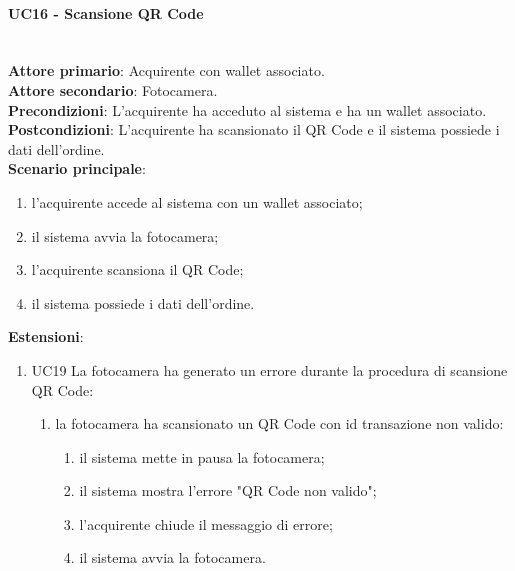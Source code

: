 \documentclass[a4paper, 12pt]{article}
\begin{document}
\paragraph{UC16 - Scansione QR Code}\\
\textbf{Attore primario}: Acquirente con wallet associato.\\
\textbf{Attore secondario}: Fotocamera.\\
\textbf{Precondizioni}: L'acquirente ha acceduto al sistema e ha un wallet associato.\\
\textbf{Postcondizioni}: L'acquirente ha scansionato il QR Code e il sistema possiede i dati dell'ordine.\\
\textbf{Scenario principale}:
\begin{enumerate}
    \item l'acquirente accede al sistema con un wallet associato;
    \item il sistema avvia la fotocamera;
    \item l'acquirente scansiona il QR Code;
    \item il sistema possiede i dati dell'ordine.
\end{enumerate}
\textbf{Estensioni}:
\begin{enumerate}
    \item UC19 La fotocamera ha generato un errore durante la procedura di scansione QR Code:
    \begin{enumerate}
        \item la fotocamera ha scansionato un QR Code con id transazione non valido:
        \begin{enumerate}
            \item il sistema mette in pausa la fotocamera;
            \item il sistema mostra l'errore "QR Code non valido";
            \item l'acquirente chiude il messaggio di errore;
            \item il sistema avvia la fotocamera.
        \end{enumerate}
    \end{enumerate}
\end{enumerate}
\end{document}
